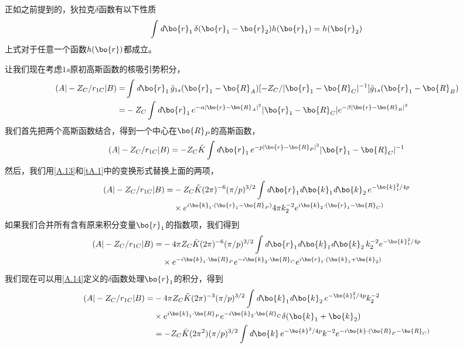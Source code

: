 正如之前提到的，狄拉克$\delta$函数有以下性质
\begin{align}
	\label{A.15}
	\int \emph{d}\bo{r}_1\,\delta(\bo{r}_1-\bo{r}_2)h(\bo{r}_1)=h(\bo{r}_2)
\end{align}
上式对于任意一个函数$h(\bo{r})$都成立。

让我们现在考虑$1s$原初高斯函数的核吸引势积分，
\begin{align}
	\label{A.16}
	(A|-Z_C/r_{1C}|B)=&\int\emph{d}\bo{r}_1\,\tilde{g}_{1s}(\bo{r}_1-\bo{R}_A)
	[-Z_C/|\bo{r}_1-\bo{R}_C|^{-1}]\tilde{g}_{1s}(\bo{r}_1-\bo{R}_B) \nonumber\\
	=&-Z_C\int\emph{d}\bo{r}_1\,e^{-\alpha\lvert \bo{r}-\bo{R}_A \rvert ^2}|\bo{r}_1-\bo{R}_C|
	e^{-\beta\lvert \bo{r}-\bo{R}_B \rvert ^2}
\end{align}
我们首先把两个高斯函数结合，得到一个中心在$\bo{R}_P$的高斯函数，
\begin{align}
	\label{A.17}
	(A|-Z_C/r_{1C}|B)=-Z_C\tilde{K}\int\emph{d}\bo{r}_1\,e^{-p\lvert \bo{r}-\bo{R}_P \rvert ^2}|\bo{r}_1-\bo{R}_C|^{-1}
\end{align}
然后，我们用\autoref{A.13}和\autoref{tA.1}中的变换形式替换上面的两项，
\begin{align}
	\label{A.18}
	(A|-Z_C/r_{1C}|B)=&-Z_C\tilde{K}(2\pi)^{-6}(\pi/p)^{3/2}
	\int\emph{d}\bo{r}_1\emph{d}\bo{k}_1\emph{d}\bo{k}_2\,e^{-\bo{k}_1^2/4p}\nonumber\\
	&\times e^{i\bo{k}_1\cdot(\bo{r}_1-\bo{R}_P)}4\pi k_2^{-2}e^{i\bo{k}_2\cdot(\bo{r}_1-\bo{R}_C)}
\end{align}
如果我们合并所有含有原来积分变量$\bo{r}_1$的指数项，我们得到
\begin{align}
	\label{A.19}
	(A|-Z_C/r_{1C}|B)=&-4\pi Z_C\tilde{K}(2\pi)^{-6}(\pi/p)^{3/2}
	\int\emph{d}\bo{r}_1\emph{d}\bo{k}_1\emph{d}\bo{k}_2\,k_2^{-2}e^{-\bo{k}_1^2/4p}\nonumber\\
	&\times e^{-i\bo{k}_1\cdot\bo{R}_P}e^{-i\bo{k}_2\cdot\bo{R}_C}e^{i\bo{r}_1\cdot(\bo{k}_1+\bo{k}_2)}
\end{align}
我们现在可以用\autoref{A.14}定义的$\delta$函数处理$\bo{r}_1$的积分，得到
\begin{align}
	\label{A.20}
	(A|-Z_C/r_{1C}|B)=&-4\pi Z_C\tilde{K}(2\pi)^{-3}(\pi/p)^{3/2}
	\int\emph{d}\bo{k}_1\emph{d}\bo{k}_2\,e^{-\bo{k}_1^2/4p}k_2^{-2}\nonumber\\
	&\times e^{i\bo{k}_1\cdot\bo{R}_P}e^{-i\bo{k}_2\cdot\bo{R}_C}\delta(\bo{k}_1+\bo{k}_2)\nonumber\\
	&=-Z_C\tilde{K}(2\pi^{2})(\pi/p)^{3/2}\int\emph{d}\bo{k}\,e^{-\bo{k}^2/4p}k^{-2} e^{-i\bo{k}\cdot(\bo{R}_P-\bo{R}_C)}
\end{align}
